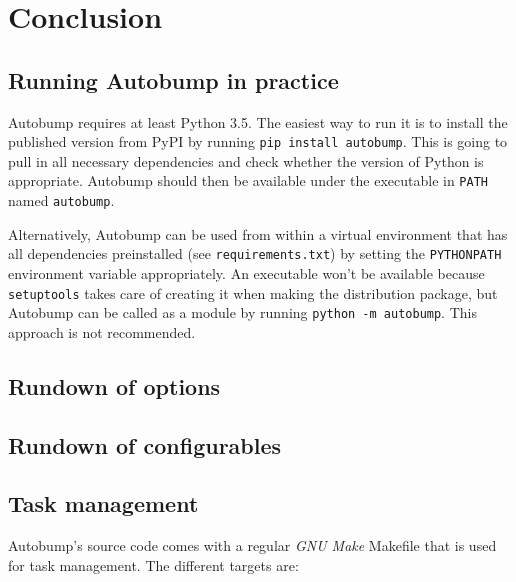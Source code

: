 \documentclass{l4proj}
\newcommand\genericstyle{\lstset{basicstyle=\ttm}}
\newcommand\codeinline[1]{{\genericstyle\lstinline!#1!}}
\begin{document}
\chapter{Conclusion}
\label{Conclusion}




\begin{appendices}

\chapter{Running Autobump in practice}
\label{AutobumpInPractice}

Autobump requires at least Python 3.5. The easiest way to run it is to
install the published version from PyPI by running \codeinline{pip
install autobump}. This is going to pull in all necessary dependencies
and check whether the version of Python is appropriate. Autobump
should then be available under the executable in \codeinline{PATH}
named \codeinline{autobump}.

Alternatively, Autobump can be used from within a virtual environment
that has all dependencies preinstalled (see
\codeinline{requirements.txt}) by setting the \codeinline{PYTHONPATH}
environment variable appropriately. An executable won't be available
because \codeinline{setuptools} takes care of creating it when making
the distribution package, but Autobump can be called as a module by
running \codeinline{python -m autobump}. This approach is not recommended.

\section{Rundown of options}
\label{RundownOptions}

\section{Rundown of configurables}
\label{RundownConfigurables}

\section{Task management}

Autobump's source code comes with a regular \textit{GNU Make} Makefile
that is used for task management. The different targets are:


\end{appendices}
\end{document}
